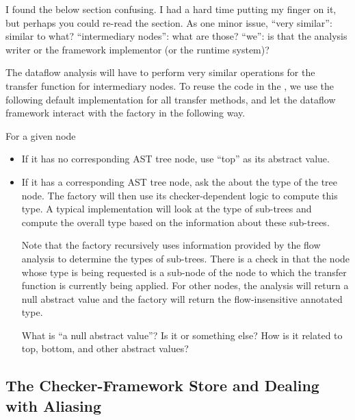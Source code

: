 \begin{workinprogress}
I found the below section confusing.  I had a hard time putting my finger
on it, but perhaps you could re-read the section.  As one minor issue,
``very similar'':  similar to what?  ``intermediary nodes'':  what are
those?  ``we'':  is that the analysis writer or the framework implementor
(or the runtime system)?
\end{workinprogress}

The dataflow analysis will have to perform very similar operations for the transfer function
for intermediary nodes.  To reuse the code in the , we
use the following default implementation for all transfer methods, and let
the dataflow framework interact with the factory in the following way.

For a given node 
\begin{itemize}
\item
    If it has no corresponding AST tree node, use ``top'' as its abstract value.
\item
    If it has a corresponding AST tree node, ask the  about
    the type of the tree node.  The factory will then use its checker-dependent logic
    to compute this type.  A typical implementation will look at the type
    of sub-trees and compute the overall type based on the information about these sub-trees.
    
    Note that the factory recursively uses information provided by the flow analysis to determine
    the types of sub-trees.  There is a check in  that the node whose type
    is being requested is a sub-node of the node to which the transfer function is currently being
    applied.  For other nodes, the analysis will return a null abstract value and the factory will
    return the flow-insensitive annotated type.

\begin{workinprogress}
What is ``a null abstract value''?  Is it  or something else?
How is it related to top, bottom, and other abstract values?
\end{workinprogress}

\end{itemize}



\subsection{The Checker-Framework Store and Dealing with Aliasing}

